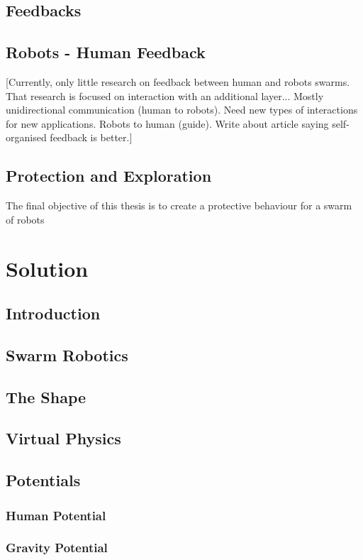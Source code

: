 \documentclass[a4paper, 12pt]{report}
\begin{document}
	\section{Feedbacks}
	\section{Robots - Human Feedback}
	
[Currently, only little research on feedback between human and robots swarms. That research is focused on interaction with an additional layer... Mostly unidirectional communication (human to robots). Need new types of interactions for new applications. Robots to human (guide). Write about article saying self-organised feedback is better.]



	\section{Protection and Exploration}
	
	The final objective of this thesis is to create a protective behaviour for a swarm of robots
	

\chapter{Solution}

	\section{Introduction}
	\section{Swarm Robotics}
	\section{The Shape}
	\section{Virtual Physics}
	\section{Potentials}
		\subsection{Human Potential}
		\subsection{Gravity Potential}
\end{document}
